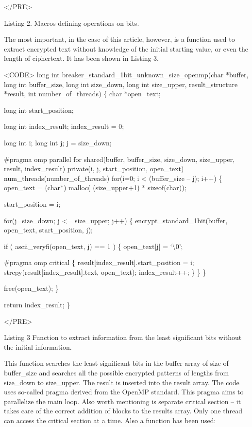 \documentclass[10pt, a5paper]{article}
\begin{document}
</PRE>

Listing 2. Macros defining operations on bits.

The most important, in the case of this article, however, is a function used to extract encrypted text without knowledge of the initial starting value, or even the length of ciphertext. It has been shown in Listing 3.

<CODE>
long int breaker\_standard\_1bit\_unknown\_size\_openmp(char *buffer, long int buffer\_size, long int size\_down, long int size\_upper, result\_structure *result, int number\_of\_threads)
\{
	char *open\_text;
	
	long int start\_position;
	
	long int index\_result;
	index\_result = 0;
	
	long int i;
	long int j;
	j = size\_down;
	
	\#pragma omp parallel for shared(buffer, buffer\_size, size\_down, size\_upper, result, index\_result) private(i, j, start\_position, open\_text) num\_threads(number\_of\_threads)
	for(i=0; i \textless{} (buffer\_size -- j); i++)
	\{
		open\_text = (char*) malloc( (size\_upper+1) * sizeof(char));

		start\_position = i;
	
		for(j=size\_down; j \textless{}= size\_upper; j++)
		\{
			encrypt\_standard\_1bit(buffer, open\_text, start\_position, j);
			
			if ( ascii\_veryfi(open\_text, j) == 1 )
			\{
				open\_text[j] = `\textbackslash{}0';
				
				\#pragma omp critical
				\{
					result[index\_result].start\_position = i;
					strcpy(result[index\_result].text, open\_text);
					index\_result++;
				\}
			\}
		\}
		
		free(open\_text);
	\}
		
	return index\_result;
\}

</PRE>

Listing 3 Function to extract information from the least significant bits without the initial information.

This function searches the least significant bits in the buffer array of size of buffer\_size and searches all the possible encrypted patterns of lengths from size\_down to size\_upper. The result is inserted into the result array. The code uses so-called pragma derived from the OpenMP standard. This pragma aims to parallelize the main loop. Also worth mentioning is separate critical section -- it takes care of the correct addition of blocks to the results array. Only one thread can access the critical section at a time. Also a function has been used:
\end{document}
